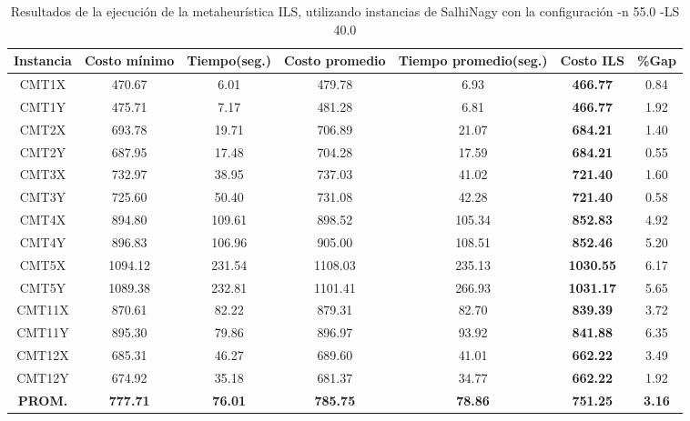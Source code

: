 \begin{table}[ht]
\caption{Resultados de la ejecución de la metaheurística ILS, utilizando instancias de SalhiNagy con la configuración -n 55.0 -LS 40.0}
\centering
\small
\begin{tabular}{c c c c c c c}
\hline\hline
Instancia & Costo mínimo & Tiempo(seg.) & Costo promedio & Tiempo promedio(seg.) & Costo ILS & \%Gap \\ [0.5ex]
\hline
CMT1X & 470.67 & 6.01 & 
479.78 & 6.93 & \bf{466.77} & 
0.84\\CMT1Y & 475.71 & 7.17 & 
481.28 & 6.81 & \bf{466.77} & 
1.92\\CMT2X & 693.78 & 19.71 & 
706.89 & 21.07 & \bf{684.21} & 
1.40\\CMT2Y & 687.95 & 17.48 & 
704.28 & 17.59 & \bf{684.21} & 
0.55\\CMT3X & 732.97 & 38.95 & 
737.03 & 41.02 & \bf{721.40} & 
1.60\\CMT3Y & 725.60 & 50.40 & 
731.08 & 42.28 & \bf{721.40} & 
0.58\\CMT4X & 894.80 & 109.61 & 
898.52 & 105.34 & \bf{852.83} & 
4.92\\CMT4Y & 896.83 & 106.96 & 
905.00 & 108.51 & \bf{852.46} & 
5.20\\CMT5X & 1094.12 & 231.54 & 
1108.03 & 235.13 & \bf{1030.55} & 
6.17\\CMT5Y & 1089.38 & 232.81 & 
1101.41 & 266.93 & \bf{1031.17} & 
5.65\\CMT11X & 870.61 & 82.22 & 
879.31 & 82.70 & \bf{839.39} & 
3.72\\CMT11Y & 895.30 & 79.86 & 
896.97 & 93.92 & \bf{841.88} & 
6.35\\CMT12X & 685.31 & 46.27 & 
689.60 & 41.01 & \bf{662.22} & 
3.49\\CMT12Y & 674.92 & 35.18 & 
681.37 & 34.77 & \bf{662.22} & 
1.92\\\bf{PROM.} & 
\bf{777.71} & \bf{76.01} & \bf{785.75} & \bf{78.86} & \bf{751.25} & \bf{3.16}\\[1ex]\hline
\end{tabular}
\label{table:nonlin}
\end{table} \clearpage
